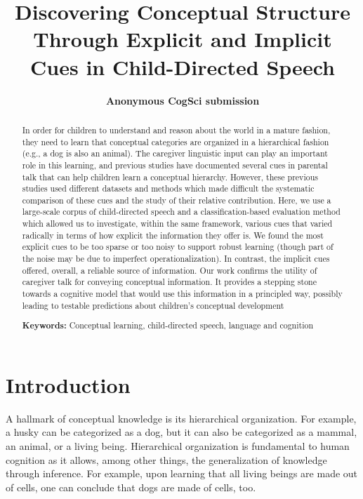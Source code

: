 \documentclass[10pt, letterpaper]{article}
\title{Discovering Conceptual Structure Through Explicit and Implicit Cues in
Child-Directed Speech}
\author{{\large \bf Anonymous CogSci submission}}
\begin{document}
\maketitle

\begin{abstract}
In order for children to understand and reason about the world in a
mature fashion, they need to learn that conceptual categories are
organized in a hierarchical fashion (e.g., a dog is also an animal). The
caregiver linguistic input can play an important role in this learning,
and previous studies have documented several cues in parental talk that
can help children learn a conceptual hierarchy. However, these previous
studies used different datasets and methods which made difficult the
systematic comparison of these cues and the study of their relative
contribution. Here, we use a large-scale corpus of child-directed speech
and a classification-based evaluation method which allowed us to
investigate, within the same framework, various cues that varied
radically in terms of how explicit the information they offer is. We
found the most explicit cues to be too sparse or too noisy to support
robust learning (though part of the noise may be due to imperfect
operationalization). In contrast, the implicit cues offered, overall, a
reliable source of information. Our work confirms the utility of
caregiver talk for conveying conceptual information. It provides a
stepping stone towards a cognitive model that would use this information
in a principled way, possibly leading to testable predictions about
children's conceptual development

\textbf{Keywords:}
Conceptual learning, child-directed speech, language and cognition
\end{abstract}

\hypertarget{introduction}{%
\section{Introduction}\label{introduction}}

A hallmark of conceptual knowledge is its hierarchical organization. For
example, a husky can be categorized as a dog, but it can also be
categorized as a mammal, an animal, or a living being. Hierarchical
organization is fundamental to human cognition as it allows, among other
things, the generalization of knowledge through inference. For example,
upon learning that all living beings are made out of cells, one can
conclude that dogs are made of cells, too.
\end{document}
